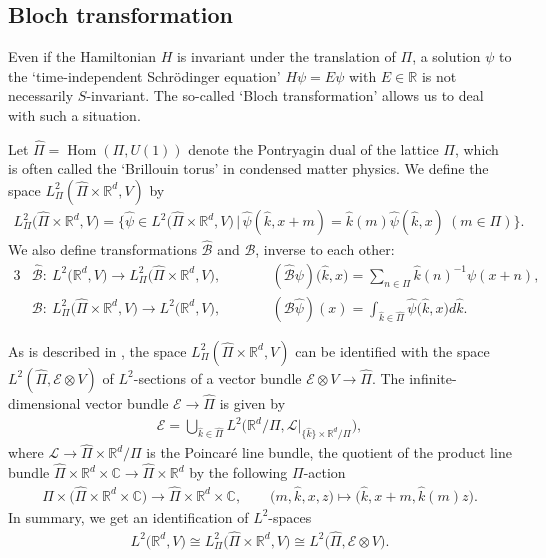 \documentclass[pdftex]{sigma}
\theoremstyle{definition}
\newcommand{\C}{\mathbb{C}}
\newcommand{\R}{\mathbb{R}}
\begin{document}
\subsection{Bloch transformation}

Even if the Hamiltonian $H$ is invariant under the translation of $\Pi$, a solution $\psi$ to the `time-independent Schr\"{o}dinger equation' $H \psi = E \psi$ with $E \in \R$ is not necessarily $S$-invariant. The so-called `Bloch transformation' allows us to deal with such a situation.

Let $\hat{\Pi} = \operatorname{Hom}(\Pi, U(1))$ denote the Pontryagin dual of the lattice $\Pi$, which is often called the `Brillouin torus' in condensed matter physics. We def\/ine the space $L^2_{\Pi}(\hat{\Pi} \times \R^d, V)$ by
\begin{gather*}
L^2_{\Pi}\big(\hat{\Pi} \times \R^d, V\big)= \big\{ \hat{\psi} \in L^2\big(\hat{\Pi} \times \R^d, V\big) \,|\,
\hat{\psi}(\hat{k}, x + m)= \hat{k}(m) \hat{\psi}(\hat{k}, x) \ (m \in \Pi)
\}.
\end{gather*}
We also def\/ine transformations $\hat{\mathcal{B}}$ and $\mathcal{B}$, inverse to each other:
\begin{alignat*}{3}
&\hat{\mathcal{B}} \colon \ L^2\big(\R^d, V\big) \longrightarrow
L^2_{\Pi}\big(\hat{\Pi} \times \R^d, V\big), \qquad &&
(\hat{\mathcal{B}}\psi)\big(\hat{k}, x\big) = \sum_{n \in \Pi} \hat{k}(n)^{-1} \psi(x + n),& \\
& \mathcal{B} \colon \ L^2_{\Pi}\big(\hat{\Pi} \times \R^d, V\big)
\longrightarrow
L^2\big(\R^d, V\big), \qquad && (\mathcal{B} \hat{\psi})(x)= \int_{\hat{k} \in \hat{\Pi}} \hat{\psi}\big(\hat{k}, x\big) d\hat{k}.&
\end{alignat*}

As is described in \cite{F-M}, the space $L^2_{\Pi}(\hat{\Pi} \times \R^d, V)$ can be identif\/ied with the space $L^2(\hat{\Pi}, \mathcal{E} \otimes V)$ of $L^2$-sections of a vector bundle $\mathcal{E} \otimes V \to \hat{\Pi}$. The inf\/inite-dimensional vector bundle $\mathcal{E} \to \hat{\Pi}$ is given by
\begin{gather*}
\mathcal{E} = \bigcup_{\hat{k} \in \hat{\Pi}} L^2\big(\R^d/\Pi, \mathcal{L}|_{\{ \hat{k} \} \times \R^d/\Pi}\big),
\end{gather*}
where $\mathcal{L} \to \hat{\Pi} \times \R^d/\Pi$ is the Poincar\'{e} line bundle, the quotient of the product line bundle $\hat{\Pi} \times \R^d \times \C \to \hat{\Pi} \times \R^d$ by the following $\Pi$-action
\begin{gather*}
\Pi \times \big(\hat{\Pi} \times \R^d \times \C\big) \longrightarrow \hat{\Pi} \times \R^d \times \C, \qquad
 \big(m, \hat{k}, x, z\big) \mapsto \big(\hat{k}, x + m, \hat{k}(m)z\big).
\end{gather*}
In summary, we get an identif\/ication of $L^2$-spaces
\begin{gather*}
L^2\big(\R^d, V\big) \cong L^2_{\Pi}\big(\hat{\Pi} \times \R^d, V\big) \cong
L^2\big(\hat{\Pi}, \mathcal{E} \otimes V\big).
\end{gather*}
\end{document}
